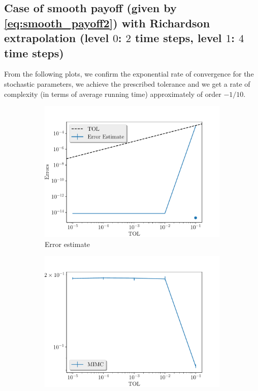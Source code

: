 \documentclass[11pt]{article}
\begin{document}
\newpage





\subsection{Case of smooth payoff (given by \eqref{eq:smooth_payoff2}) with Richardson extrapolation (level $0$: $2$ time steps, level $1$: $4$ time steps)}
From the following plots, we confirm the exponential rate of convergence for the stochastic parameters, we achieve the prescribed tolerance and  we get a rate of complexity (in terms of average running time) approximately of order $-1/10$.

\begin{figure}[!h]
	\centering
	\begin{subfigure}{.5\textwidth}
		\centering
		\includegraphics[width=1\linewidth]{./figures/1D_BS_2_4_steps_smooth_second_payoff_eps_10_5_richardson/error_estimate.pdf}
		\caption{Error estimate}
		\label{fig:misc_1D_BS_2_4_steps_smooth_second_payoff_eps_10_5_sub1}
	\end{subfigure}%
	\begin{subfigure}{.5\textwidth}
		\centering
		\includegraphics[width=1\linewidth]{./figures/1D_BS_2_4_steps_smooth_second_payoff_eps_10_5_richardson/average_running_time.pdf}

\end{subfigure}
\end{figure}
\end{document}
